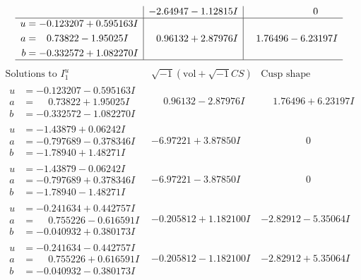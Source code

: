 \documentclass[1p]{elsarticle_modified}
\theoremstyle{definition}
\newcommand{\I}{\sqrt{-1}}
\begin{document}
$$\begin{array}{c|c|c}
 & -2.64947 - 1.12815 I & \phantom{-0.000000 } 0 \\ \hline\begin{aligned}
u &= -0.123207 + 0.595163 I \\
a &= \phantom{-}0.73822 - 1.95025 I \\
b &= -0.332572 + 1.082270 I\end{aligned}
 & \phantom{-}0.96132 + 2.87976 I & \phantom{-}1.76496 - 6.23197 I\\
 \hline 
 \end{array}$$\newpage$$\begin{array}{c|c|c}  
\text{Solutions to }I^u_{1}& \I (\text{vol} + \sqrt{-1}CS) & \text{Cusp shape}\\
 \hline 
\begin{aligned}
u &= -0.123207 - 0.595163 I \\
a &= \phantom{-}0.73822 + 1.95025 I \\
b &= -0.332572 - 1.082270 I\end{aligned}
 & \phantom{-}0.96132 - 2.87976 I & \phantom{-}1.76496 + 6.23197 I \\ \hline\begin{aligned}
u &= -1.43879 + 0.06242 I \\
a &= -0.797689 - 0.378346 I \\
b &= -1.78940 + 1.48271 I\end{aligned}
 & -6.97221 + 3.87850 I & \phantom{-0.000000 } 0 \\ \hline\begin{aligned}
u &= -1.43879 - 0.06242 I \\
a &= -0.797689 + 0.378346 I \\
b &= -1.78940 - 1.48271 I\end{aligned}
 & -6.97221 - 3.87850 I & \phantom{-0.000000 } 0 \\ \hline\begin{aligned}
u &= -0.241634 + 0.442757 I \\
a &= \phantom{-}0.755226 - 0.616591 I \\
b &= -0.040932 + 0.380173 I\end{aligned}
 & -0.205812 + 1.182100 I & -2.82912 - 5.35064 I \\ \hline\begin{aligned}
u &= -0.241634 - 0.442757 I \\
a &= \phantom{-}0.755226 + 0.616591 I \\
b &= -0.040932 - 0.380173 I\end{aligned}
 & -0.205812 - 1.182100 I & -2.82912 + 5.35064 I \\ \hline\begin{aligned}

\end{aligned}
\end{array}$$
\end{document}

